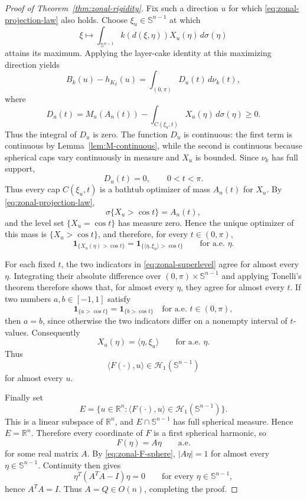 \documentclass[10pt,a4paper]{amsart}
\begin{document}
\begin{proof}[Proof of Theorem~\ref{thm:zonal-rigidity}]
Fix such a direction $u$ for which
\eqref{eq:zonal-projection-law} also holds.  Choose
$\xi_u\in\mathbb S^{n-1}$ at which
\[
 \xi\longmapsto
 \int_{\mathbb S^{n-1}} k(d(\xi,\eta))X_u(\eta)\,d\sigma(\eta)
\]
attains its maximum.  Applying the layer-cake identity at this maximizing
direction yields
\[
 B_k(u)-h_{K_k}(u)
 =
 \int_{(0,\pi)}D_u(t)\,d\nu_k(t),
\]
where
\[
 D_u(t)
 =
 M_u(A_n(t))
 -
 \int_{C(\xi_u,t)}X_u(\eta)\,d\sigma(\eta)
 \ge0.
\]
Thus the integral of $D_u$ is zero.  The function $D_u$ is continuous:
the first term is continuous by Lemma~\ref{lem:M-continuous}, while the
second is continuous because spherical caps vary continuously in measure
and $X_u$ is bounded.  Since $\nu_k$ has full support,
\[
 D_u(t)=0,\qquad0<t<\pi.
\]
Thus every cap $C(\xi_u,t)$ is a bathtub optimizer of mass $A_n(t)$ for
$X_u$.  By \eqref{eq:zonal-projection-law},
\[
 \sigma\{X_u>\cos t\}=A_n(t),
\]
and the level set $\{X_u=\cos t\}$ has measure zero.  Hence the unique
optimizer of this mass is $\{X_u>\cos t\}$, and therefore, for every
$t\in(0,\pi)$,
\begin{equation}\label{eq:zonal-superlevel}
 \mathbf1_{\{X_u(\eta)>\cos t\}}
 =
 \mathbf1_{\{\langle\eta,\xi_u\rangle>\cos t\}}
 \qquad\text{for a.e. }\eta.
\end{equation}

For each fixed $t$, the two indicators in
\eqref{eq:zonal-superlevel} agree for almost every $\eta$.  Integrating
their absolute difference over $(0,\pi)\times\mathbb S^{n-1}$ and applying
Tonelli's theorem therefore shows that, for almost every $\eta$, they agree
for almost every $t$.  If two numbers $a,b\in[-1,1]$ satisfy
\[
 \mathbf1_{\{a>\cos t\}}=\mathbf1_{\{b>\cos t\}}
 \quad\text{for a.e. }t\in(0,\pi),
\]
then $a=b$, since otherwise the two indicators differ on a nonempty interval
of $t$-values.  Consequently
\[
 X_u(\eta)=\langle\eta,\xi_u\rangle
 \qquad\text{for a.e. }\eta.
\]
Thus
\[
 \langle F(\cdot),u\rangle
 \in\mathcal H_1(\mathbb S^{n-1})
\]
for almost every $u$.

Finally set
\[
 E=
 \{u\in\mathbb R^n:
 \langle F(\cdot),u\rangle\in\mathcal H_1(\mathbb S^{n-1})\}.
\]
This is a linear subspace of $\mathbb R^n$, and
$E\cap\mathbb S^{n-1}$ has full spherical measure.  Hence $E=\mathbb R^n$.
Therefore every coordinate of $F$ is a first spherical harmonic, so
\[
 F(\eta)=A\eta
 \qquad\text{a.e.}
\]
for some real matrix $A$.  By \eqref{eq:zonal-F-sphere},
$|A\eta|=1$ for almost every $\eta\in\mathbb S^{n-1}$.  Continuity then
gives
\[
 \eta^T(A^TA-I)\eta=0
 \qquad\text{for every }\eta\in\mathbb S^{n-1},
\]
hence $A^TA=I$.  Thus $A=Q\in O(n)$, completing the proof.
\end{proof}
\end{document}
